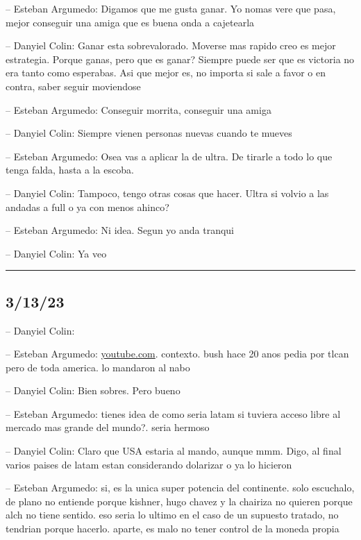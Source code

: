 -- Esteban Argumedo: Digamos que me gusta ganar. Yo nomas vere que pasa,
mejor conseguir una amiga que es buena onda a cajetearla

-- Danyiel Colin: Ganar esta sobrevalorado. Moverse mas rapido creo es
mejor estrategia. Porque ganas, pero que es ganar? Siempre puede ser que
es victoria no era tanto como esperabas. Asi que mejor es, no importa si
sale a favor o en contra, saber seguir moviendose

-- Esteban Argumedo: Conseguir morrita, conseguir una amiga

-- Danyiel Colin: Siempre vienen personas nuevas cuando te mueves

-- Esteban Argumedo: Osea vas a aplicar la de ultra. De tirarle a todo
lo que tenga falda, hasta a la escoba.

-- Danyiel Colin: Tampoco, tengo otras cosas que hacer. Ultra si volvio
a las andadas a full o ya con menos ahinco?

-- Esteban Argumedo: Ni idea. Segun yo anda tranqui

-- Danyiel Colin: Ya veo

\begin{center}\rule{0.5\linewidth}{0.5pt}\end{center}

\hypertarget{section-192}{%
\subsection{3/13/23}\label{section-192}}

-- Danyiel Colin:

-- Esteban Argumedo:
\href{https://www.youtube.com/watch?v=mY7bDiGfN5o}{youtube.com}.
contexto. bush hace 20 anos pedia por tlcan pero de toda america. lo
mandaron al nabo

-- Danyiel Colin: Bien sobres. Pero bueno

-- Esteban Argumedo: tienes idea de como seria latam si tuviera acceso
libre al mercado mas grande del mundo?. seria hermoso

-- Danyiel Colin: Claro que USA estaria al mando, aunque mmm. Digo, al
final varios paises de latam estan considerando dolarizar o ya lo
hicieron

-- Esteban Argumedo: si, es la unica super potencia del continente. solo
escuchalo, de plano no entiende porque kishner, hugo chavez y la
chairiza no quieren porque alch no tiene sentido. eso seria lo ultimo en
el caso de un supuesto tratado, no tendrian porque hacerlo. aparte, es
malo no tener control de la moneda propia

